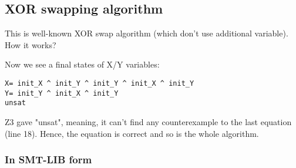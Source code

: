 \subsection{XOR swapping algorithm}

This is well-known XOR swap algorithm (which don't use additional variable).
How it works?



Now we see a final states of X/Y variables:

\begin{lstlisting}
X= init_X ^ init_Y ^ init_Y ^ init_X ^ init_Y
Y= init_Y ^ init_X ^ init_Y
unsat
\end{lstlisting}

Z3 gave "unsat", meaning, it can't find any counterexample to the last equation (line 18).
Hence, the equation is correct and so is the whole algorithm.

\subsubsection{In SMT-LIB form}





